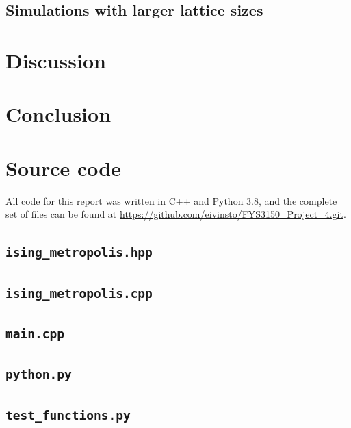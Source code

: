 \documentclass[reprint,english,notitlepage]{revtex4-1}  %
\begin{document}
\subsection{Simulations with larger lattice sizes} \label{sec:IV:D}





\newpage

\section{Discussion} \label{sec:V}


\newpage

\section{Conclusion} \label{sec:VI}


\onecolumngrid
{}
\newpage
\twocolumngrid

\appendix
\section{Source code} \label{A}
All code for this report was written in C++ and Python 3.8, and the complete set of files can be found at
\url{https://github.com/eivinsto/FYS3150_Project_4.git}.

\cprotect\subsection{\verb+ising_metropolis.hpp+} \label{A.1}

\cprotect\subsection{\verb+ising_metropolis.cpp+} \label{A.2}

\cprotect\subsection{\verb+main.cpp+} \label{A.3}

\cprotect\subsection{\verb+python.py+} \label{A.4}

\cprotect\subsection{\verb+test_functions.py+} \label{A.5}
\end{document}
